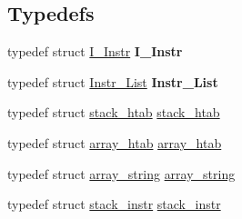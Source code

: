 \subsection*{Typedefs}
\begin{DoxyCompactItemize}
\item 
\hypertarget{group__structures_gadfc08cf22bec87cfe209d4921155d12d}{}typedef struct \hyperlink{structI__Instr}{I\+\_\+\+Instr} {\bfseries I\+\_\+\+Instr}\label{group__structures_gadfc08cf22bec87cfe209d4921155d12d}

\item 
\hypertarget{group__structures_ga5045b797aa91051c0510688714632408}{}typedef struct \hyperlink{structInstr__List}{Instr\+\_\+\+List} {\bfseries Instr\+\_\+\+List}\label{group__structures_ga5045b797aa91051c0510688714632408}

\item 
typedef struct \hyperlink{structstack__htab}{stack\+\_\+htab} \hyperlink{group__structures_ga2942b6731254b98ce39056197f5d171a}{stack\+\_\+htab}
\item 
typedef struct \hyperlink{structarray__htab}{array\+\_\+htab} \hyperlink{group__structures_gafa5247cb58c9cbc3aacc8616d3bd3406}{array\+\_\+htab}
\item 
typedef struct \hyperlink{structarray__string}{array\+\_\+string} \hyperlink{group__structures_gae454366e089196c48b5339fb91a9c7e4}{array\+\_\+string}
\item 
typedef struct \hyperlink{structstack__instr}{stack\+\_\+instr} \hyperlink{group__structures_ga8644786468172a68ec450346ae4d6522}{stack\+\_\+instr}
\end{DoxyCompactItemize}
